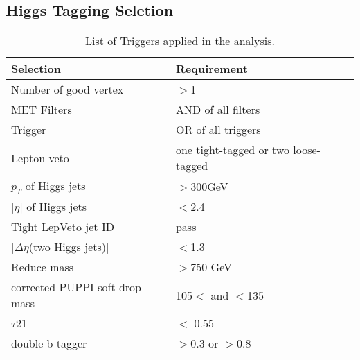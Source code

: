 \subsection{Higgs Tagging Seletion} 



\begin{table}[h!]
  \begin{center}
    \begin{tabular}{ll}
    Selection & Requirement \\
    \hline
    Number of good vertex & $>$1 \\
    MET Filters & AND of all filters\\
	Trigger & OR of all triggers\\
	Lepton veto & one tight-tagged or two loose-tagged \\
    $p_{T}$ of Higgs jets & $>$300GeV \\
	|$\eta$| of Higgs jets & $<$2.4 \\
	Tight LepVeto jet ID & pass \\
	|$\Delta \eta $(two Higgs jets)| & $<$1.3 \\
	Reduce mass & $>$750 GeV \\
	corrected PUPPI soft-drop mass & 105$<$ and $<$135 \\
	$\tau$21 & $<$ 0.55 \\
	double-b tagger & $>$0.3 or $>$0.8 \\
	\hline
    \end{tabular}
  \end{center}

  \caption{List of Triggers applied in the analysis.}
\end{table} 